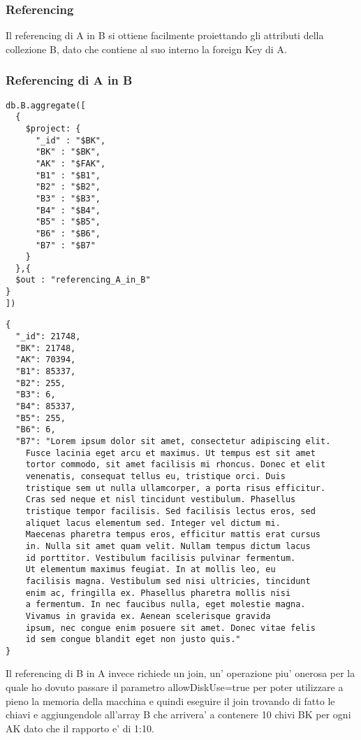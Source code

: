 \subsubsection{Referencing}

Il referencing di A in B si ottiene facilmente proiettando gli attributi della collezione B, dato che contiene al suo interno la foreign Key di A.

\subsubsection{Referencing di A in B}

\begin{verbatim}
db.B.aggregate([
  {
    $project: {
      "_id" : "$BK",
      "BK" : "$BK",
      "AK" : "$FAK",
      "B1" : "$B1",   
      "B2" : "$B2",
      "B3" : "$B3",
      "B4" : "$B4",
      "B5" : "$B5",
      "B6" : "$B6",
      "B7" : "$B7"
    }
  },{
  $out : "referencing_A_in_B"
}
])
\end{verbatim}

\begin{Verbatim}[frame=single,framesep=2mm,label= Referencing di A in B,labelposition=all]
{
  "_id": 21748,
  "BK": 21748,
  "AK": 70394,
  "B1": 85337,
  "B2": 255,
  "B3": 6,
  "B4": 85337,
  "B5": 255,
  "B6": 6,
  "B7": "Lorem ipsum dolor sit amet, consectetur adipiscing elit. 
    Fusce lacinia eget arcu et maximus. Ut tempus est sit amet 
    tortor commodo, sit amet facilisis mi rhoncus. Donec et elit
    venenatis, consequat tellus eu, tristique orci. Duis 
    tristique sem ut nulla ullamcorper, a porta risus efficitur.
    Cras sed neque et nisl tincidunt vestibulum. Phasellus 
    tristique tempor facilisis. Sed facilisis lectus eros, sed 
    aliquet lacus elementum sed. Integer vel dictum mi. 
    Maecenas pharetra tempus eros, efficitur mattis erat cursus
    in. Nulla sit amet quam velit. Nullam tempus dictum lacus
    id porttitor. Vestibulum facilisis pulvinar fermentum.
    Ut elementum maximus feugiat. In at mollis leo, eu 
    facilisis magna. Vestibulum sed nisi ultricies, tincidunt
    enim ac, fringilla ex. Phasellus pharetra mollis nisi
    a fermentum. In nec faucibus nulla, eget molestie magna.
    Vivamus in gravida ex. Aenean scelerisque gravida 
    ipsum, nec congue enim posuere sit amet. Donec vitae felis
    id sem congue blandit eget non justo quis."
}
\end{Verbatim}

Il referencing di B in A invece richiede un join, un' operazione piu' onerosa per la quale ho dovuto passare il parametro allowDiskUse=true per poter utilizzare
a pieno la memoria della macchina e quindi eseguire il join trovando di fatto le chiavi e aggiungendole all'array B che arrivera' a contenere 10 chivi BK per ogni 
AK dato che il rapporto e' di 1:10. 

